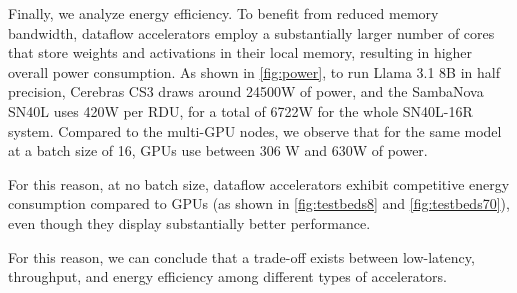 Finally, we analyze energy efficiency. To benefit from reduced memory bandwidth, dataflow accelerators employ a substantially larger number of cores that store weights and activations in their local memory, resulting in higher overall power consumption. As shown in \ref{fig:power}, to run Llama 3.1 8B in half precision, Cerebras CS3 draws around 24500W of power, and the SambaNova SN40L uses 420W per RDU, for a total of 6722W for the whole SN40L-16R system. Compared to the multi-GPU nodes, we observe that for the same model at a batch size of 16, GPUs use between 306 W and 630W of power.

For this reason, at no batch size, dataflow accelerators exhibit competitive energy consumption compared to GPUs (as shown in \ref{fig:testbeds8} and \ref{fig:testbeds70}), even though they display substantially better performance.

For this reason, we can conclude that a trade-off exists between low-latency, throughput, and energy efficiency among different types of accelerators.
